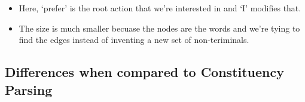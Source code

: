 \documentclass[11pt]{article}
\begin{document}
\begin{minipage}[l]{.5\linewidth}
    \begin{figure}[H]
        \centering
    \end{figure}    
\end{minipage}\hfill
\begin{minipage}[r]{.48\linewidth}
    \begin{itemize}
        \item Here, `prefer' is the root action that we're interested in and `I' modifies that. 
        \item The size is much smaller becuase the nodes are the words and we're tying to find the edges instead of inventing a new set of non-teriminals.
    \end{itemize}
\end{minipage}

\subsection{Differences when compared to Constituency Parsing}
\end{document}
